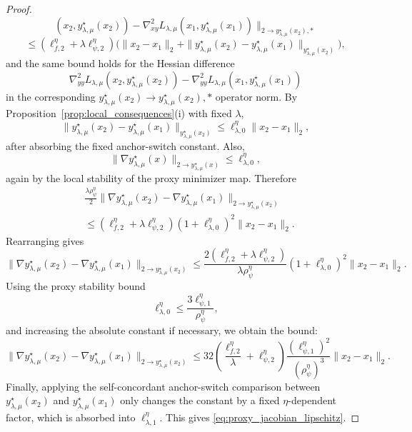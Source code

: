 \documentclass{article}
\begin{document}
\begin{proof}
\[(x_2,y_{\lambda,\mu}^\star(x_2))
-
\nabla^2_{xy}L_{\lambda,\mu}
(x_1,y_{\lambda,\mu}^\star(x_1))
\Big\|_{2\to y_{\lambda,\mu}^\star(x_2),*}
\]
\[
\le
(\ell_{f,2}^\eta+\lambda\ell_{\psi,2}^\eta)
\Big(
\|x_2-x_1\|_2
+
\|y_{\lambda,\mu}^\star(x_2)-y_{\lambda,\mu}^\star(x_1)\|_{y_{\lambda,\mu}^\star(x_2)}
\Big),
\]
and the same bound holds for the Hessian difference
\[
\nabla^2_{yy}L_{\lambda,\mu}
(x_2,y_{\lambda,\mu}^\star(x_2))
-
\nabla^2_{yy}L_{\lambda,\mu}
(x_1,y_{\lambda,\mu}^\star(x_1))
\]
in the corresponding \(y_{\lambda,\mu}^\star(x_2)\to y_{\lambda,\mu}^\star(x_2),*\) operator norm.
By Proposition~\ref{prop:local_consequences}\textup{(i)} with fixed \(\lambda\),
\[
\|y_{\lambda,\mu}^\star(x_2)-y_{\lambda,\mu}^\star(x_1)\|_{y_{\lambda,\mu}^\star(x_2)}
\le
\ell_{\lambda,0}^\eta\|x_2-x_1\|_2,
\]
after absorbing the fixed anchor-switch constant. Also,
\[
\big\|\nabla y_{\lambda,\mu}^\star(x)\big\|_{2\to y_{\lambda,\mu}^\star(x)}
\le
\ell_{\lambda,0}^\eta ,
\]
again by the local stability of the proxy minimizer map. Therefore
\begin{align}
&\frac{\lambda\rho_\psi^\eta}{2}
\big\|
\nabla y_{\lambda,\mu}^\star(x_2)
-
\nabla y_{\lambda,\mu}^\star(x_1)
\big\|_{2\to y_{\lambda,\mu}^\star(x_2)}
\nonumber\\
&\le
(\ell_{f,2}^\eta+\lambda\ell_{\psi,2}^\eta)
(1+\ell_{\lambda,0}^\eta)^2
\|x_2-x_1\|_2 .
\label{eq:proxy_jacobian_pre_final}
\end{align}
Rearranging gives
\[
\big\|
\nabla y_{\lambda,\mu}^\star(x_2)
-
\nabla y_{\lambda,\mu}^\star(x_1)
\big\|_{2\to y_{\lambda,\mu}^\star(x_2)}
\le
\frac{2(\ell_{f,2}^\eta+\lambda\ell_{\psi,2}^\eta)}
{\lambda\rho_\psi^\eta}
(1+\ell_{\lambda,0}^\eta)^2
\|x_2-x_1\|_2.
\]
Using the proxy stability bound
\[
\ell_{\lambda,0}^\eta
\le
\frac{3\ell_{\psi,1}^\eta}{\rho_\psi^\eta},
\]
and increasing the absolute constant if necessary, we obtain the bound:
\begin{equation}
\label{eq:proxy_jacobian_final}
\big\|
\nabla y_{\lambda,\mu}^\star(x_2)
-
\nabla y_{\lambda,\mu}^\star(x_1)
\big\|_{2\to y_{\lambda,\mu}^\star(x_2)}
\le
32\left(
\frac{\ell_{f,2}^\eta}{\lambda}
+
\ell_{\psi,2}^\eta
\right)
\frac{(\ell_{\psi,1}^\eta)^2}{(\rho_\psi^\eta)^3}
\|x_2-x_1\|_2 .
\end{equation}
Finally, applying the self-concordant anchor-switch comparison between
\(y_{\lambda,\mu}^\star(x_2)\) and \(y_{\lambda,\mu}^\star(x_1)\) only changes the constant by a fixed
\(\eta\)-dependent factor, which is absorbed into
\(\ell_{\lambda,1}^\eta\). This gives \eqref{eq:proxy_jacobian_lipschitz}.
\end{proof}
\end{document}
